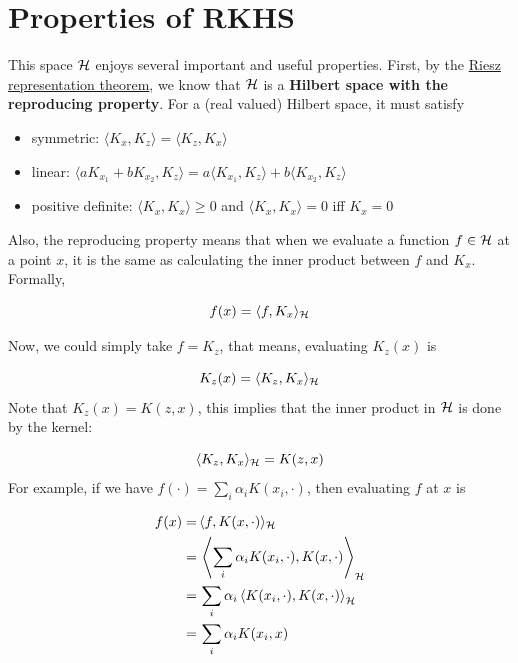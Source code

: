 \documentclass[
]{book}
\providecommand{\tightlist}{%
  \setlength{\itemsep}{0pt}\setlength{\parskip}{0pt}}
\theoremstyle{definition}
\theoremstyle{definition}
\theoremstyle{definition}
\theoremstyle{definition}
\theoremstyle{remark}
\begin{document}
\hypertarget{properties-of-rkhs}{%
\section{Properties of RKHS}\label{properties-of-rkhs}}

This space \(\cal H\) enjoys several important and useful properties. First, by the \href{https://en.wikipedia.org/wiki/Riesz_representation_theorem}{Riesz representation theorem}, we know that \(\cal H\) is a \textbf{Hilbert space with the reproducing property}. For a (real valued) Hilbert space, it must satisfy

\begin{itemize}
\tightlist
\item
  symmetric: \(\langle K_x, K_z \rangle = \langle K_z, K_x \rangle\)
\item
  linear: \(\langle a K_{x_1} + b K_{x_2}, K_z \rangle = a \langle K_{x_1}, K_z \rangle + b \langle K_{x_2}, K_z \rangle\)
\item
  positive definite: \(\langle K_x, K_x \rangle \geq 0\) and \(\langle K_x, K_x \rangle = 0\) iff \(K_x = 0\)
\end{itemize}

Also, the reproducing property means that when we evaluate a function \(f \in \cal H\) at a point \(x\), it is the same as calculating the inner product between \(f\) and \(K_x\). Formally,

\[f(x) = \langle f, K_x \rangle_{\cal H}\]

Now, we could simply take \(f = K_z\), that means, evaluating \(K_z(x)\) is

\[K_z(x) = \langle K_z, K_x \rangle_{\cal H}\]
Note that \(K_z(x) = K(z, x)\), this implies that the inner product in \(\cal H\) is done by the kernel:

\[\langle K_z, K_x \rangle_{\cal H} = K(z, x)\]
For example, if we have \(f(\cdot) = \sum_i \alpha_i K(x_i, \cdot)\), then evaluating \(f\) at \(x\) is

\begin{align}
f(x) =& \, \langle f, K(x, \cdot) \rangle_{\cal H} \nonumber \\
=& \, \left\langle \sum_i \alpha_i K(x_i, \cdot), K(x, \cdot) \right\rangle_{\cal H} \nonumber \\
=& \, \sum_i \alpha_i \left\langle K(x_i, \cdot), K(x, \cdot) \right\rangle_{\cal H} \nonumber \\
=& \, \sum_i \alpha_i K(x_i, x)
\end{align}
\end{document}
